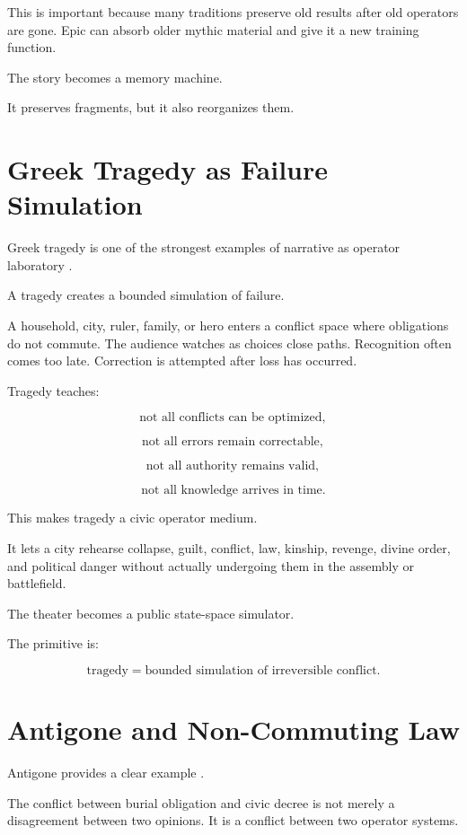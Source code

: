 \documentclass[11pt]{book}
\begin{document}
This is important because many traditions preserve old results after old operators are gone. Epic can absorb older mythic material and give it a new training function.

The story becomes a memory machine.

It preserves fragments, but it also reorganizes them.

\section{Greek Tragedy as Failure Simulation}

Greek tragedy is one of the strongest examples of narrative as operator laboratory \cite{LefkowitzRomilly2016GreekTragedies,VernantVidalNaquet1988MythTragedy}.

A tragedy creates a bounded simulation of failure.

A household, city, ruler, family, or hero enters a conflict space where obligations do not commute. The audience watches as choices close paths. Recognition often comes too late. Correction is attempted after loss has occurred.

Tragedy teaches:

\[
\text{not all conflicts can be optimized},
\]

\[
\text{not all errors remain correctable},
\]

\[
\text{not all authority remains valid},
\]

\[
\text{not all knowledge arrives in time}.
\]

This makes tragedy a civic operator medium.

It lets a city rehearse collapse, guilt, conflict, law, kinship, revenge, divine order, and political danger without actually undergoing them in the assembly or battlefield.

The theater becomes a public state-space simulator.

The primitive is:

\[
\text{tragedy} = \text{bounded simulation of irreversible conflict}.
\]

\section{Antigone and Non-Commuting Law}

Antigone provides a clear example \cite{LefkowitzRomilly2016GreekTragedies}.

The conflict between burial obligation and civic decree is not merely a disagreement between two opinions. It is a conflict between two operator systems.
\end{document}

